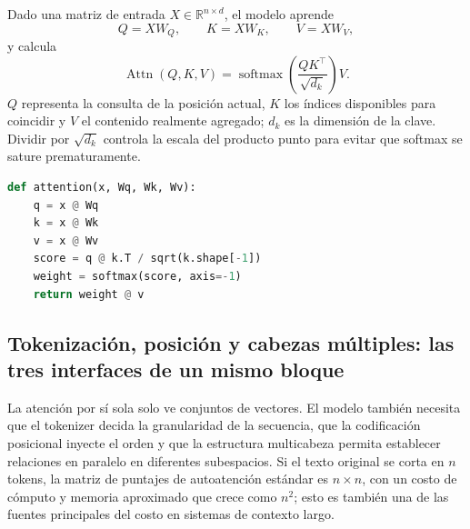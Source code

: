 Dado una matriz de entrada $X\in\mathbb{R}^{n\times d}$, el modelo aprende
\[
Q=XW_Q,\qquad K=XW_K,\qquad V=XW_V,
\]
y calcula
\[
\operatorname{Attn}(Q,K,V)
=\operatorname{softmax}\!\left(\frac{QK^{\top}}{\sqrt{d_k}}\right)V.
\]
$Q$ representa la consulta de la posición actual, $K$ los índices disponibles para coincidir y $V$ el contenido realmente agregado; $d_k$ es la dimensión de la clave. Dividir por $\sqrt{d_k}$ controla la escala del producto punto para evitar que softmax se sature prematuramente.




\begin{lstlisting}[language=Python,caption={Pseudocódigo mínimo para atención de producto punto escalado}]
def attention(x, Wq, Wk, Wv):
    q = x @ Wq
    k = x @ Wk
    v = x @ Wv
    score = q @ k.T / sqrt(k.shape[-1])
    weight = softmax(score, axis=-1)
    return weight @ v
\end{lstlisting}

\subsection{Tokenización, posición y cabezas múltiples: las tres interfaces de un mismo bloque}

La atención por sí sola solo ve conjuntos de vectores. El modelo también necesita que el tokenizer decida la granularidad de la secuencia, que la codificación posicional inyecte el orden y que la estructura multicabeza permita establecer relaciones en paralelo en diferentes subespacios. Si el texto original se corta en $n$ tokens, la matriz de puntajes de autoatención estándar es $n\times n$, con un costo de cómputo y memoria aproximado que crece como $n^2$; esto es también una de las fuentes principales del costo en sistemas de contexto largo.



